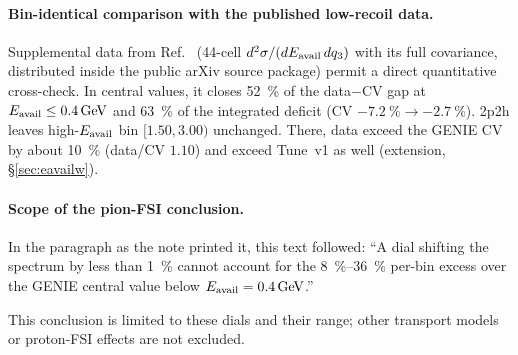 \paragraph{Bin-identical comparison with the published low-recoil data.} Supplemental data from Ref.~\cite{MINERvA:2022incl} (44-cell $d^{2}\sigma/(dE_{\mathrm{avail}}\,dq_{3})$ with its full covariance, distributed inside the public arXiv source package) permit a direct quantitative cross-check. In central values, it closes \SI{52}{\percent} of the data$-$CV gap at $E_{\mathrm{avail}}\le\SI{0.4}{GeV}$ and \SI{63}{\percent} of the integrated deficit (CV $-\SI{7.2}{\percent}\to-\SI{2.7}{\percent}$). 2p2h leaves high-$E_{\mathrm{avail}}$ bin $[1.50,3.00)$ unchanged. There, data exceed the GENIE CV by about \SI{10}{\percent} (data/CV $1.10$) and exceed Tune~v1 as well (extension, \S\ref{sec:eavailw}).

\paragraph{Scope of the pion-FSI conclusion.} In the paragraph as the note printed it, this text followed: ``A dial shifting the spectrum by less than \SI{1}{\percent} cannot account for the \SIrange{8}{36}{\percent} per-bin excess over the GENIE central value below $E_{\mathrm{avail}}=\SI{0.4}{GeV}$.''\par This conclusion is limited to these dials and their range; other transport models or proton-FSI effects are not excluded.

